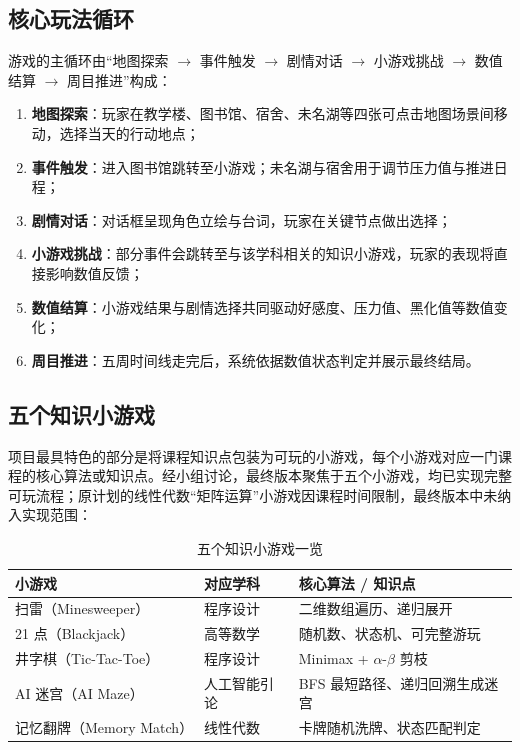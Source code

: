\documentclass[12pt]{article}
\begin{document}
\subsection{核心玩法循环}
游戏的主循环由“地图探索 $\rightarrow$ 事件触发 $\rightarrow$ 剧情对话 $\rightarrow$ 小游戏挑战 $\rightarrow$ 数值结算 $\rightarrow$ 周目推进”构成：

\begin{enumerate}[itemsep=2pt]
  \item \textbf{地图探索}：玩家在教学楼、图书馆、宿舍、未名湖等四张可点击地图场景间移动，选择当天的行动地点；
  \item \textbf{事件触发}：进入图书馆跳转至小游戏；未名湖与宿舍用于调节压力值与推进日程；
  \item \textbf{剧情对话}：对话框呈现角色立绘与台词，玩家在关键节点做出选择；
  \item \textbf{小游戏挑战}：部分事件会跳转至与该学科相关的知识小游戏，玩家的表现将直接影响数值反馈；
  \item \textbf{数值结算}：小游戏结果与剧情选择共同驱动好感度、压力值、黑化值等数值变化；
  \item \textbf{周目推进}：五周时间线走完后，系统依据数值状态判定并展示最终结局。
\end{enumerate}

\subsection{五个知识小游戏}
项目最具特色的部分是将课程知识点包装为可玩的小游戏，每个小游戏对应一门课程的核心算法或知识点。经小组讨论，最终版本聚焦于五个小游戏，均已实现完整可玩流程；原计划的线性代数“矩阵运算”小游戏因课程时间限制，最终版本中未纳入实现范围：

\begin{table}[h]
\centering
\small
\begin{tabular}{@{}lll@{}}
\toprule
\textbf{小游戏} & \textbf{对应学科} & \textbf{核心算法 / 知识点} \\
\midrule
扫雷（Minesweeper） & 程序设计 & 二维数组遍历、递归展开 \\
21 点（Blackjack） & 高等数学 & 随机数、状态机、可完整游玩 \\
井字棋（Tic-Tac-Toe） & 程序设计 & Minimax + $\alpha$-$\beta$ 剪枝 \\
AI 迷宫（AI Maze） & 人工智能引论 & BFS 最短路径、递归回溯生成迷宫 \\
记忆翻牌（Memory Match） & 线性代数 & 卡牌随机洗牌、状态匹配判定 \\
\bottomrule
\end{tabular}
\caption{五个知识小游戏一览}
\end{table}
\end{document}
